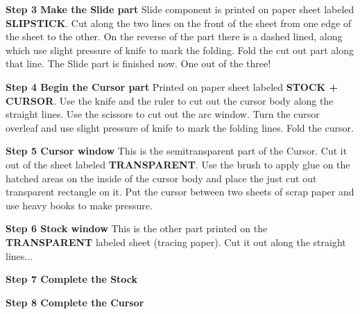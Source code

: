 \documentclass[a4paper,9pt]{article}
\begin{document}
\begin{multicols*}{3}
{  \textbf{Step 3 Make the Slide part} Slide component is printed on paper sheet labeled \textbf{SLIPSTICK}. Cut along the two lines on the front of the sheet from one edge of the sheet to the other. On the reverse of the part there is a dashed lined, along which use slight pressure of knife to mark the folding. Fold the cut out part along that line. The Slide part is finished now. One out of the three!

  \textbf{Step 4 Begin the Cursor part} Printed on paper sheet labeled \textbf{STOCK + CURSOR}. Use the knife and the ruler to cut out the cursor body along the straight lines. Use the scissors to cut out the arc window. Turn the cursor overleaf and use slight pressure of knife to mark the folding lines. Fold the cursor.

  \textbf{Step 5 Cursor window} This is the semitransparent part of the Cursor. Cut it out of the sheet labeled \textbf{TRANSPARENT}. Use the brush to apply glue on the hatched areas on the inside of the cursor body and place the just cut out transparent rectangle on it. Put the cursor between two sheets of scrap paper and use heavy books to make pressure.

  \textbf{Step 6 Stock window} This is the other part printed on the \textbf{TRANSPARENT} labeled sheet (tracing paper). Cut it out along the straight lines...

  \textbf{Step 7 Complete the Stock}

  \textbf{Step 8 Complete the Cursor}

  }
  \end{multicols*}
  
\end{document}
